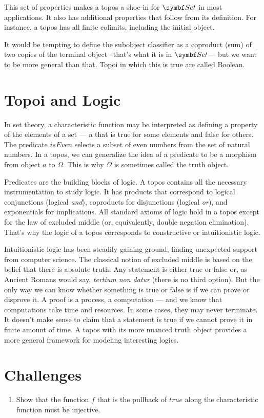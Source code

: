 This set of properties makes a topos a shoe-in for $\Set$ in most
applications. It also has additional properties that follow from its
definition. For instance, a topos has all finite colimits, including the
initial object.

It would be tempting to define the subobject classifier as a coproduct
(sum) of two copies of the terminal object --that's what it is in
$\Set$--- but we want to be more general than that. Topoi in which
this is true are called Boolean.

\section{Topoi and Logic}

In set theory, a characteristic function may be interpreted as defining
a property of the elements of a set --- a  that is true
for some elements and false for others. The predicate $isEven$
selects a subset of even numbers from the set of natural numbers. In a
topos, we can generalize the idea of a predicate to be a morphism from
object $a$ to $\Omega$. This is why $\Omega$ is sometimes
called the truth object.

Predicates are the building blocks of logic. A topos contains all the
necessary instrumentation to study logic. It has products that
correspond to logical conjunctions (logical \emph{and}), coproducts for
disjunctions (logical \emph{or}), and exponentials for implications. All
standard axioms of logic hold in a topos except for the law of excluded
middle (or, equivalently, double negation elimination). That's why the
logic of a topos corresponds to constructive or intuitionistic logic.

Intuitionistic logic has been steadily gaining ground, finding
unexpected support from computer science. The classical notion of
excluded middle is based on the belief that there is absolute truth: Any
statement is either true or false or, as Ancient Romans would say,
\emph{tertium non datur} (there is no third option). But the only way we
can know whether something is true or false is if we can prove or
disprove it. A proof is a process, a computation --- and we know that
computations take time and resources. In some cases, they may never
terminate. It doesn't make sense to claim that a statement is true if we
cannot prove it in finite amount of time. A topos with its more nuanced
truth object provides a more general framework for modeling interesting
logics.

\section{Challenges}\label{challenges}

\begin{enumerate}
\tightlist
\item
  Show that the function $f$ that is the pullback of
  $true$ along the characteristic function must be injective.
\end{enumerate}
